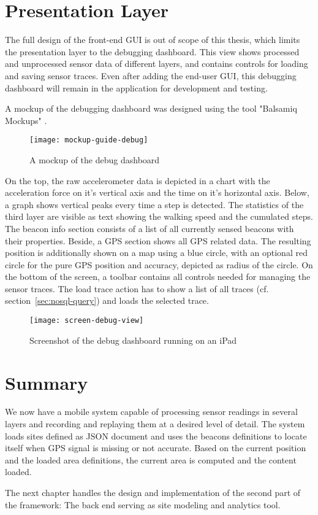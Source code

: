 \section{Presentation Layer}


The full design of the front-end GUI is out of scope of this thesis, which limits the presentation layer to the debugging dashboard.
This view shows processed and unprocessed sensor data of different layers, and contains controls for loading and saving sensor traces. Even after adding the end-user GUI, this debugging dashboard will remain in the application for development and testing.

A mockup of the debugging dashboard was designed using the tool "Balsamiq Mockups" \cite{balsamiq}.

\begin{figure}[H]
\centering
\texttt{[image: mockup-guide-debug]}
\caption{A mockup of the debug dashboard}
\label{fig:couchbase-query}
\end{figure}

On the top, the raw accelerometer data is depicted in a chart with the acceleration force on it's vertical axis and the time on it's horizontal axis. Below, a graph shows vertical peaks every time a step is detected. The statistics of the third layer are visible as text showing the walking speed and the cumulated steps.
The beacon info section consists of a list of all currently sensed beacons with their properties. Beside, a GPS section shows all GPS related data. The resulting position is additionally shown on a map using a blue circle, with an optional red circle for the pure GPS position and accuracy, depicted as radius of the circle. On the bottom of the screen, a toolbar contains all controls needed for managing the sensor traces. The load trace action has to show a list of all traces (cf. section~\ref{sec:nosql-query}) and loads the selected trace.

\begin{figure}[H]
\centering
\texttt{[image: screen-debug-view]}
\caption{Screenshot of the debug dashboard running on an iPad}
\label{fig:couchbase-query}
\end{figure}

\section{Summary}

We now have a mobile system capable of processing sensor readings in several layers and recording and replaying them at a desired level of detail. 
The system loads sites defined as JSON document and uses the beacons definitions to locate itself when GPS signal is missing or not accurate. Based on the current position and the loaded area definitions, the current area is computed and the content loaded.

The next chapter handles the design and implementation of the second part of the framework: The back end serving as site modeling and analytics tool.